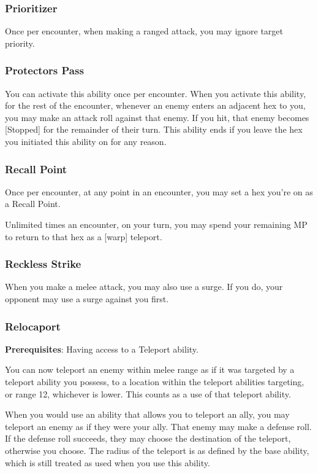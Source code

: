 \begin{multicols*}{2}
\subsubsection{Prioritizer \R }
Once per encounter, when making a ranged attack, you may ignore target priority.

\subsubsection{Protectors Pass}
You can activate this ability once per encounter. When you activate this ability, for the rest of the encounter, whenever an enemy enters an adjacent hex to you, you may make an attack roll against that enemy. If you hit, that enemy becomes [Stopped] for the remainder of their turn. This ability ends if you leave the hex you initiated this ability on for any reason.

\subsubsection{Recall Point}
Once per encounter, at any point in an encounter, you may set a hex you’re on as a Recall Point.

Unlimited times an encounter, on your turn, you may spend your remaining MP to return to that hex as a [warp] teleport.

\subsubsection{Reckless Strike}
When you make a melee attack, you may also use a surge. If you do, your opponent may use a surge against you first.

\subsubsection{Relocaport}
\textbf{Prerequisites}: Having access to a Teleport ability.

You can now teleport an enemy within melee range as if it was targeted by a teleport ability you possess, to a location within the teleport abilities targeting, or range 12, whichever is lower. This counts as a use of that teleport ability.

When you would use an ability that allows you to teleport an ally, you may teleport an enemy as if they were your ally. That enemy may make a defense roll. If the defense roll succeeds, they may choose the destination of the teleport, otherwise you choose. The radius of the teleport is as defined by the base ability, which is still treated as used when you use this ability.


\end{multicols*}
